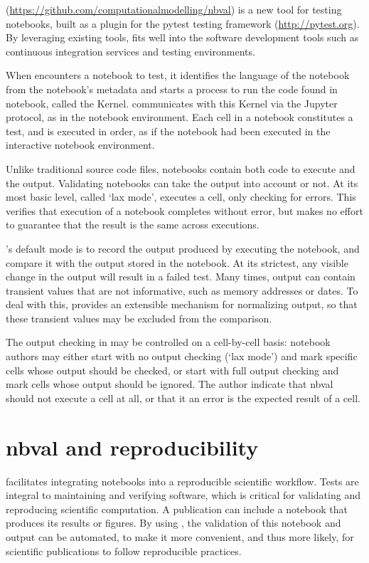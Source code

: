 \documentclass{deliverablereport}
\begin{document}
\nbval (\url{https://github.com/computationalmodelling/nbval}) is a new tool for testing notebooks, built as a plugin for the pytest testing framework (\url{http://pytest.org}).
By leveraging existing tools,
\nbval fits well into the software development tools such as continuous integration services and testing environments.

When \nbval encounters a notebook to test, it identifies the language of the notebook from the notebook's metadata and starts a process to run the code found in notebook, called the Kernel.
\nbval communicates with this Kernel via the Jupyter protocol, as in the notebook environment.
Each cell in a notebook constitutes a test, and is executed in order,
as if the notebook had been executed in the interactive notebook environment.

Unlike traditional source code files,
notebooks contain both code to execute and the output.
Validating notebooks can take the output into account or not.
At its most basic level, called `lax mode', \nbval executes a cell, only checking for errors.
This verifies that execution of a notebook completes without error,
but makes no effort to guarantee that the result is the same across executions.

\nbval's default mode is to record the output produced by executing the notebook,
and compare it with the output stored in the notebook.
At its strictest, any visible change in the output will result in a failed test.
Many times, output can contain transient values that are not informative,
such as memory addresses or dates.
To deal with this, \nbval provides an extensible mechanism for normalizing output,
so that these transient values may be excluded from the comparison.

The output checking in \nbval may be controlled on a cell-by-cell basis:
notebook authors may either start with no output checking (`lax mode') and mark specific cells whose output should be checked,
or start with full output checking and mark cells whose output should be ignored.
The author indicate that nbval should not execute a cell at all,
or that it an error is the expected result of a cell.

\section{nbval and reproducibility} %

\nbval facilitates integrating notebooks into a reproducible scientific workflow.
Tests are integral to maintaining and verifying software,
which is critical for validating and reproducing scientific computation.
A publication can include a notebook that produces its results or figures.
By using \nbval, the validation of this notebook and output can be automated,
to make it more convenient, and thus more likely,
for scientific publications to follow reproducible practices.
\end{document}
